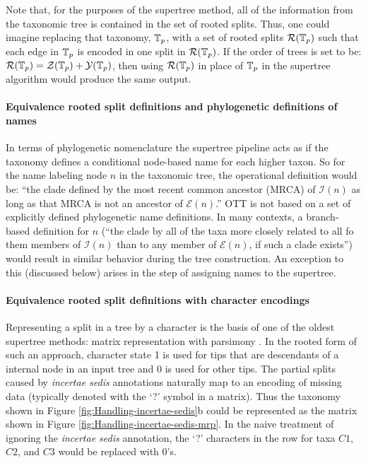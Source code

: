 \documentclass[english]{article}
\begin{document}
Note that, for the purposes of the supertree method, all of the information from
the taxonomic tree is contained in the set of rooted splits. Thus, one could
imagine replacing that taxonomy, $\mbox{\ensuremath{\mathbb{T}}}_{p}$, with a set of rooted splits $\mathcal{R}(\mbox{\ensuremath{\mathbb{T}}}_{p})$ such that
each edge in $\mbox{\ensuremath{\mathbb{T}}}_{p}$ is encoded in one split in $\mathcal{R}(\mbox{\ensuremath{\mathbb{T}}}_{p})$. If the order of trees is set
to be: $\mathcal{R}(\mbox{\ensuremath{\mathbb{T}}}_{p})=\mathcal{Z}(\mbox{\ensuremath{\mathbb{T}}}_{p}) + 
\mathcal{Y}(\mbox{\ensuremath{\mathbb{T}}}_{p})$, then using $\mathcal{R}(\mbox{\ensuremath{\mathbb{T}}}_{p})$ in place of $\mbox{\ensuremath{\mathbb{T}}}_{p}$ in the supertree
algorithm would produce the same output.

\paragraph{Equivalence rooted split definitions and phylogenetic definitions of names}
In terms of phylogenetic nomenclature the supertree pipeline acts as if the
taxonomy defines a conditional node-based name \citep[see][]{deQueiroz2013} for each
higher taxon.
So for the name labeling node $n$ in the taxonomic
tree, the operational definition would be: ``the clade defined by the most recent
common ancestor (MRCA) of $\mathcal{I}(n)$ as long as that MRCA is not an ancestor of
$\mathcal{E}(n)$.''
OTT is not based on a set of explicitly defined phylogenetic name definitions.
In many contexts, a branch-based definition for $n$ (``the clade by all of the taxa more
closely related to all fo them members of $\mathcal{I}(n)$ than to any member of
$\mathcal{E}(n)$, if such a clade exists'') would result in similar behavior
during the tree construction. 
An exception to this (discussed below) arises in the step of assigning names to the 
    supertree.

\paragraph{Equivalence rooted split definitions with character encodings}
Representing a split in a tree by a character is the basis of one of the oldest
    supertree methods: matrix representation with parsimony \citep[MRP, see][]{Baum1992,Ragan1992}.
In the rooted form of such an approach, character state 1 is used for tips that are
    descendants of a internal node in an input tree and 0 is used for other tips.
The partial splits caused by \emph{incertae sedis} annotations naturally map to
    an encoding of missing data (typically denoted with the `?' symbol in a matrix).
Thus the taxonomy shown in Figure \ref{fig:Handling-incertae-sedis}b could be represented as the matrix shown in 
    Figure \ref{fig:Handling-incertae-sedis-mrp}.
In the naive treatment of ignoring the \emph{incertae sedis} annotation, the `?' characters
   in the row for taxa $C1$, $C2$, and $C3$ would be replaced with 0's.
\end{document}
